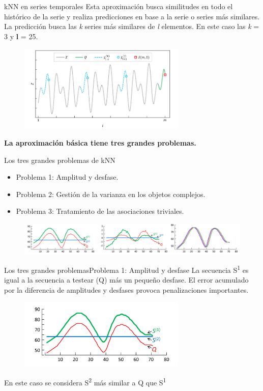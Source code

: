\documentclass[12pt, aspectratio=169]{beamer} %
\begin{document}
\begin{frame}{kNN en series temporales}
  Esta aproximación busca similitudes en todo el histórico de la serie y realiza predicciones en base a la serie o series más similares.
  La predicción busca las \textit{k} series más similares de \textit{l} elementos. En este caso las \textit{k} = 3 y \textbf{l} = 25.
  \begin{figure}
  \includegraphics[width=8cm]{20210312_1_knn_summary.png}
  \label{fig:ejemplo_knn_ts}
\end{figure}
\textbf{La aproximación básica tiene tres grandes problemas.}
\end{frame}

\begin{frame}{Los tres grandes problemas de kNN}

  \begin{itemize}
  \item Problema 1: Amplitud y desfase.
  \item Problema 2: Gestión de la varianza en los objetos complejos.
  \item Problema 3: Tratamiento de las asociaciones triviales.
  \end{itemize}

  \begin{figure}
    \includegraphics[width=1\textwidth]{20210313_1_tres_metricas.png}
  \end{figure}
  
\end{frame}

\begin{frame}{Los tres grandes problemas}{Problema 1: Amplitud y desfase}
  La secuencia S\textsuperscript{1} es igual a la secuencia a testear (Q) más un pequeño desfase.
  El error acumulado por la diferencia de amplitudes y desfases provoca penalizaciones importantes.

  \begin{figure}
      \includegraphics[width=8cm]{20210312_2_problema_offset.png}
      \label{fig:problema_1}
  \end{figure}
  En este caso se considera S\textsuperscript{2} más similar a Q que S\textsuperscript{1}
\end{frame}
\end{document}
